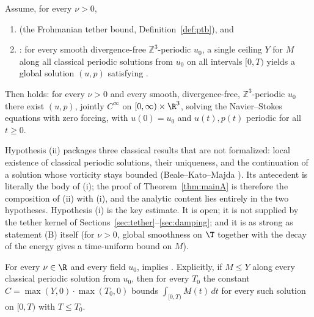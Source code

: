 \begin{theorem}\label{thm:mainA}
Assume, for every $\nu>0$,
\begin{enumerate}[label=(\roman*)]
\item {} (the Frohmanian tether bound, Definition~\ref{def:ptb}), and
\item {}: for every smooth divergence-free $\mathbb{Z}^3$-periodic $u_0$, a single
ceiling $Y$ for $M$ along all classical periodic solutions from $u_0$ on all intervals $[0,T)$ yields a global
solution $(u,p)$ satisfying .
\end{enumerate}
Then  holds: for every $\nu>0$ and every smooth, divergence-free, $\mathbb{Z}^3$-periodic
$u_0$ there exist $(u,p)$, jointly $C^\infty$ on $[0,\infty)\times\R^3$, solving the Navier--Stokes equations
with zero forcing, with $u(0)=u_0$ and $u(t),p(t)$ periodic for all $t\ge0$.
\end{theorem}

Hypothesis (ii) packages three classical results that are not formalized: local existence of classical
periodic solutions, their uniqueness, and the continuation of a solution whose vorticity stays bounded
(Beale--Kato--Majda \cite{BKM1984}). Its antecedent is literally the body of (i); the proof of
Theorem~\ref{thm:mainA} is therefore the composition of (ii) with (i), and the analytic content lies entirely in
the two hypotheses. Hypothesis (i) is the key estimate. It is open; it is not supplied by the tether kernel of
Sections~\ref{sec:tether}--\ref{sec:damping}; and it is as strong as statement (B) itself (for $\nu>0$, global
smoothness on $\T$ together with the decay of the energy gives a time-uniform bound on $M$).

\begin{theorem}\label{thm:mainB}
For every $\nu\in\R$ and every field $u_0$,  implies
. Explicitly, if $M\le Y$ along every classical periodic solution from
$u_0$, then for every $T_0$ the constant $C=\max(Y,0)\cdot\max(T_0,0)$ bounds $\int_{[0,T)}M(t)\,dt$ for every
such solution on $[0,T)$ with $T\le T_0$.
\end{theorem}

